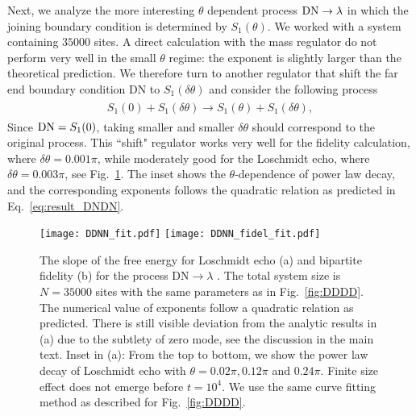 Next, we analyze the more interesting $\theta$ dependent process {\color{red}${\rm DN} \rightarrow \lambda$}
in which the joining boundary condition is determined by $S_1(\theta)$. {\color{red}We worked with a system containing $35000$ sites.} A direct calculation with the mass regulator do not perform very well in the small $\theta$ regime: the exponent is slightly larger than the theoretical prediction. We therefore turn to another regulator that shift the far end boundary condition DN to $S_1( \delta \theta )$ and consider the following process
\begin{eqnarray}\begin{aligned}
\label{eq:approx_DNDN}
S_1(0)+S_1(\delta\theta)\rightarrow S_1(\theta)+S_1(\delta\theta),
\end{aligned}\end{eqnarray}
Since ${\rm DN} = S_1 (0 )$, taking smaller and smaller $\delta \theta$ should correspond to the original process. This ``shift" regulator works very well for the fidelity calculation, where $\delta \theta = 0.001 \pi$, while moderately good for the Loschmidt echo, where $\delta \theta = 0.003\pi$, see Fig.~\ref{fig:DDNN}. The inset shows the $\theta$-dependence of power law decay, and the corresponding exponents follows the quadratic relation as predicted in Eq.~\eqref{eq:result_DNDN}. %

\begin{figure}
  \centering
\texttt{[image: DDNN\_fit.pdf]}
\texttt{[image: DDNN\_fidel\_fit.pdf]}
    \caption{The slope of the free energy for Loschmidt echo (a) and bipartite fidelity (b) for the process $\text{DN} \rightarrow \lambda$ {\iffalse in Eq.~\eqref{eq:DNDN}\fi}. The total system size is $N=35000$ sites with the same parameters as in Fig.~\ref{fig:DDDD}. The numerical value of exponents follow a quadratic relation as predicted. There is still visible deviation from the analytic results in (a) due to the subtlety of zero mode, see the discussion in the main text. Inset in (a): From the top to bottom, we show the power law decay of Loschmidt echo with $\theta=0.02\pi, 0.12\pi $ and $0.24\pi$. Finite size effect does not emerge before $t=10^{4}$. We use the same curve fitting method as described for Fig.~\ref{fig:DDDD}.}
      \label{fig:DDNN}
\end{figure}


